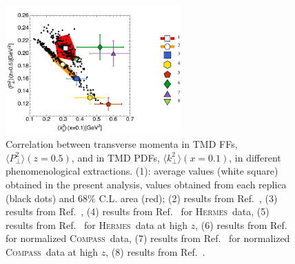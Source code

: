 \documentclass[aps,preprintnumbers,showpacs,nofootinbib,superscriptaddress,floatfix]{revtex4}
\newcommand{\hermes}{\textsc{Hermes}}
\newcommand{\compass}{\textsc{Compass}}
\begin{document}
\begin{figure}[h!]
\begin{center}
\includegraphics[width=0.60\textwidth]{plots/kT2_PT2_flav_indep}
\end{center}
\caption{Correlation between transverse momenta in TMD FFs, $\langle P_\perp^2
  \rangle(z=0.5)$, and in TMD PDFs, $\langle k_\perp^2 \rangle(x=0.1)$, in
  different phenomenological extractions. 
 (1): average values (white square) obtained in the present analysis, values
 obtained from each replica (black dots) and
 $68\%$ C.L. area (red); (2) results from Ref.~\cite{Signori:2013mda},
 (3) results from Ref.~\cite{Schweitzer:2010tt}, (4) results from Ref.~\cite{Anselmino:2013lza} for
 \hermes\ data, 
 (5) results from Ref.~\cite{Anselmino:2013lza} for \hermes\ data at high $z$, (6) results from Ref.~\cite{Anselmino:2013lza} for normalized \compass\ data, (7) results from Ref.~\cite{Anselmino:2013lza} for normalized \compass\ data at high $z$, (8) results from Ref.~\cite{Echevarria:2014xaa}.} 
\label{f:kT2_vs_PT2}
\end{figure}
\end{document}
